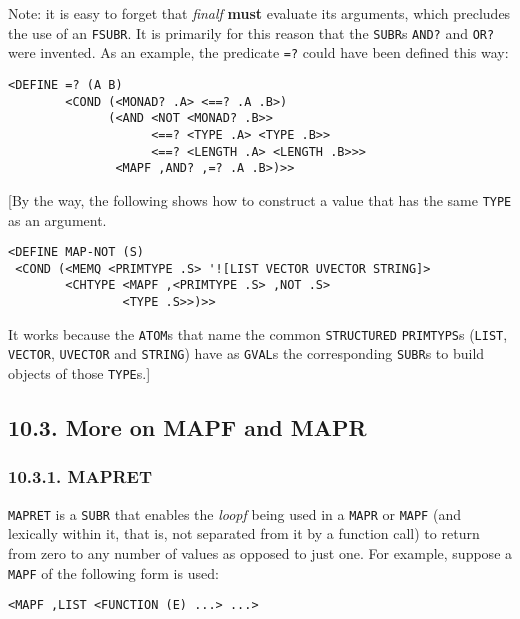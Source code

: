 \documentclass[a4paper,]{article}
\begin{document}
Note: it is easy to forget that \emph{finalf} \textbf{must} evaluate its arguments, which precludes the use of an
\texttt{FSUBR}. It is primarily for this reason that the \texttt{SUBR}s \texttt{AND?}  and
\texttt{OR?}  were invented. As an example, the predicate \texttt{=?}  could have
been defined this way:

\begin{verbatim}
<DEFINE =? (A B)
        <COND (<MONAD? .A> <==? .A .B>)
              (<AND <NOT <MONAD? .B>>
                    <==? <TYPE .A> <TYPE .B>>
                    <==? <LENGTH .A> <LENGTH .B>>>
               <MAPF ,AND? ,=? .A .B>)>>
\end{verbatim}

{[}By the way, the following shows how to construct a value that has the same \texttt{TYPE}  as an
argument.

\begin{verbatim}
<DEFINE MAP-NOT (S)
 <COND (<MEMQ <PRIMTYPE .S> '![LIST VECTOR UVECTOR STRING]>
        <CHTYPE <MAPF ,<PRIMTYPE .S> ,NOT .S>
                <TYPE .S>>)>>
\end{verbatim}

It works because the \texttt{ATOM}s that name the common \texttt{STRUCTURED} \texttt{PRIMTYPS}s (\texttt{LIST},
\texttt{VECTOR}, \texttt{UVECTOR} and \texttt{STRING}) have as \texttt{GVAL}s the corresponding \texttt{SUBR}s to build
objects of those \texttt{TYPE}s.{]}

\subsection{10.3. More on MAPF and MAPR}\label{more-on-mapf-and-mapr}

\subsubsection{10.3.1. MAPRET}\label{mapret}

\texttt{MAPRET}  is a \texttt{SUBR} that enables the \emph{loopf} being used in a
\texttt{MAPR} or \texttt{MAPF} (and lexically within it, that is, not separated from it by a function call) to return from
zero to any number of values as opposed to just one. For example, suppose a \texttt{MAPF} of the following form is used:

\begin{verbatim}
<MAPF ,LIST <FUNCTION (E) ...> ...>
\end{verbatim}
\end{document}

